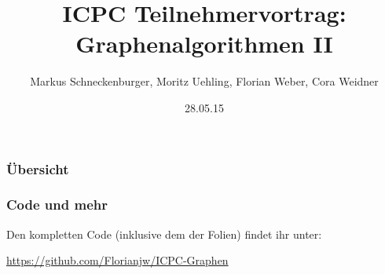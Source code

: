 \documentclass{beamer}
\title[Graphen II]{ICPC Teilnehmervortrag: Graphenalgorithmen II} %
\author{Markus Schneckenburger, Moritz Uehling, Florian Weber, Cora Weidner } %
\institute[UCLA] %
{
	KIT\\ICPC-Teilnehmervortrag
}
\date{28.05.15} %
\begin{document}
\begin{frame}
\titlepage %
\end{frame}

\begin{frame}
\frametitle{Übersicht} 
\tableofcontents
\end{frame}

\begin{frame}
\frametitle{Code und mehr} 
Den kompletten Code (inklusive dem der Folien) findet ihr unter: 

\url{https://github.com/Florianjw/ICPC-Graphen}

\end{frame}


%





\end{document}
